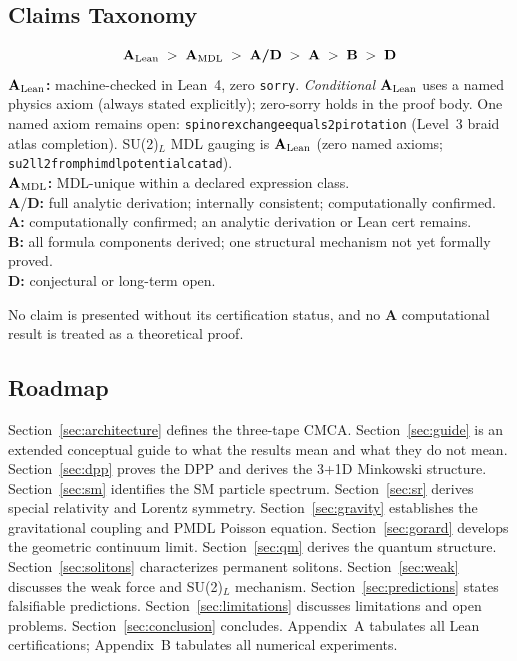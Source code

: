 \documentclass[11pt]{article}
\theoremstyle{remark}
\newcommand{\lean}[1]{%
  \penalty-100
  \begingroup\def\_{\textunderscore\allowbreak}\texttt{#1}\endgroup}
\newcommand{\CatA}{\textbf{A}}
\newcommand{\CatAL}{\ensuremath{\textbf{A}_{\rm Lean}}}
\newcommand{\CatAMDL}{\ensuremath{\textbf{A}_{\rm MDL}}}
\newcommand{\CatAD}{\textbf{A/D}}
\newcommand{\CatB}{\textbf{B}}
\newcommand{\CatD}{\textbf{D}}
\newcommand{\CMCA}{\text{CMCA}}
\begin{document}
\subsection{Claims Taxonomy}

\begin{tcolorbox}[colback=gray!4,colframe=gray!50!black,
  title={\textbf{Claim-strength taxonomy}},
  fonttitle=\bfseries,left=6pt,right=6pt,top=5pt,bottom=5pt]
\small
\[
\CatAL \;>\; \CatAMDL \;>\; \CatAD \;>\; \CatA \;>\; \CatB \;>\; \CatD
\]
\textbf{$\CatAL$:} machine-checked in Lean~4, zero \texttt{sorry}.
  \emph{Conditional} $\CatAL$ uses a named physics axiom (always stated explicitly);
  zero-sorry holds in the proof body.
  One named axiom remains open: \lean{spinor\_exchange\_equals\_2pi\_rotation}
  (Level~3 braid atlas completion).
  SU(2)$_L$ MDL gauging is $\CatAL$ (zero named axioms;
  \lean{su2l\_l2\_from\_phimdl\_potential\_catad}).\\
\textbf{$\CatAMDL$:} MDL-unique within a declared expression class.\\
\textbf{$\CatAD$:} full analytic derivation; internally consistent; computationally confirmed.\\
\textbf{$\CatA$:} computationally confirmed; an analytic derivation or Lean cert remains.\\
\textbf{$\CatB$:} all formula components derived; one structural mechanism not yet formally proved.\\
\textbf{$\CatD$:} conjectural or long-term open.
\end{tcolorbox}

No claim is presented without its certification status, and no $\CatA$
computational result is treated as a theoretical proof.

\subsection{Roadmap}

Section~\ref{sec:architecture} defines the three-tape $\CMCA$. Section~\ref{sec:guide}
is an extended conceptual guide to what the results mean and what they do not
mean. Section~\ref{sec:dpp} proves the DPP and derives the 3+1D Minkowski
structure. Section~\ref{sec:sm} identifies the SM particle spectrum.
Section~\ref{sec:sr} derives special relativity and Lorentz symmetry.
Section~\ref{sec:gravity} establishes the gravitational coupling and PMDL
Poisson equation. Section~\ref{sec:gorard} develops the geometric continuum
limit. Section~\ref{sec:qm} derives the quantum structure. Section~\ref{sec:solitons}
characterizes permanent solitons. Section~\ref{sec:weak} discusses the weak force
and SU(2)$_L$ mechanism. Section~\ref{sec:predictions} states falsifiable
predictions. Section~\ref{sec:limitations} discusses limitations and open
problems. Section~\ref{sec:conclusion} concludes. Appendix~A tabulates all
Lean certifications; Appendix~B tabulates all numerical experiments.
\end{document}

